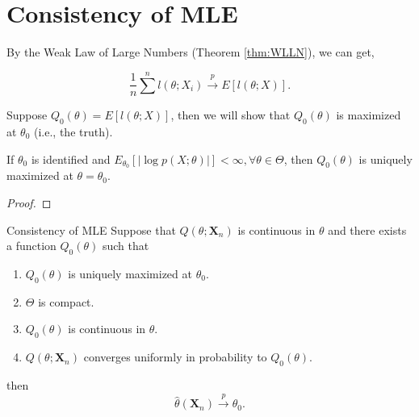 \section{Consistency of MLE}

By the Weak Law of Large Numbers (Theorem \ref{thm:WLLN}), we can get,

\begin{equation}
    \frac{1}{n}\sum^{n}l\left(\theta;X_{i}\right)\stackrel{p}{\rightarrow}E\left[l(\theta;X)\right].
\end{equation}

Suppose $Q_{0}(\theta)=E\left[l(\theta;X)\right]$, then we will show that $Q_{0}(\theta)$ is maximized at $\theta_{0}$ (i.e., the truth).

\begin{lemma}{}{}
    If $\theta_{0}$ is identified and $E_{\theta_{0}}\left[|\log p(X;\theta)|\right]<\infty,\forall\theta\in\Theta$, then $Q_{0}(\theta)$ is uniquely maximized at $\theta=\theta_{0}$.
\end{lemma}

\begin{proof}

\end{proof}

\begin{theorem}{Consistency of MLE}{}
    Suppose that $Q\left(\theta;\textbf{X}_{n}\right)$ is continuous in $\theta$ and there exists a function $Q_{0}(\theta)$ such that
    \begin{enumerate}
        \item $Q_{0}(\theta)$ is uniquely maximized at $\theta_{0}$.
        \item $\Theta$ is compact.
        \item $Q_{0}(\theta)$ is continuous in $\theta$.
        \item $Q\left(\theta;\textbf{X}_{n}\right)$ converges uniformly in probability to $Q_{0}(\theta)$.
    \end{enumerate}
    then
    \begin{equation}
        \hat{\theta}\left(\textbf{X}_{n}\right)\stackrel{p}{\rightarrow}\theta_{0}.
    \end{equation}
\end{theorem}

